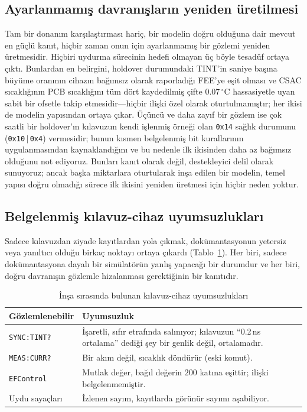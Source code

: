 \documentclass[9pt,twocolumn,a4paper]{extarticle}
\begin{document}
\subsection{Ayarlanmamış davranışların yeniden üretilmesi}
Tam bir donanım karşılaştırması hariç, bir modelin doğru olduğuna dair mevcut en güçlü kanıt, hiçbir zaman onun için ayarlanmamış bir gözlemi yeniden üretmesidir. Hiçbiri uydurma sürecinin hedefi olmayan üç böyle tesadüf ortaya çıktı. Bunlardan en belirgini, holdover durumundaki TINT'in saniye başına büyüme oranının cihazın bağımsız olarak raporladığı FEE'ye eşit olması ve CSAC sıcaklığının PCB sıcaklığını tüm dört kaydedilmiş çifte $0.07\,^\circ$C hassasiyetle uyan sabit bir ofsetle takip etmesidir---hiçbir ilişki özel olarak oturtulmamıştır; her ikisi de modelin yapısından ortaya çıkar. Üçüncü ve daha zayıf bir gözlem ise çok saatli bir holdover'ın kılavuzun kendi işlenmiş örneği olan \texttt{0x14} sağlık durumunu (\texttt{0x10}\,$\vert$\,\texttt{0x4}) vermesidir; bunun kısmen belgelenmiş bit kurallarının uygulanmasından kaynaklandığını ve bu nedenle ilk ikisinden daha az bağımsız olduğunu not ediyoruz. Bunları kanıt olarak değil, destekleyici delil olarak sunuyoruz; ancak başka miktarlara oturtularak inşa edilen bir modelin, temel yapısı doğru olmadığı sürece ilk ikisini yeniden üretmesi için hiçbir neden yoktur.

\subsection{Belgelenmiş kılavuz-cihaz uyumsuzlukları}
Sadece kılavuzdan ziyade kayıtlardan yola çıkmak, dokümantasyonun yetersiz veya yanıltıcı olduğu birkaç noktayı ortaya çıkardı (Tablo~\ref{tab:discrepancies}). Her biri, sadece dokümantasyona dayalı bir simülatörün yanlış yapacağı bir durumdur ve her biri, doğru davranışın gözlemle hizalanması gerektiğinin bir kanıtıdır.

\begin{table}[t]
\caption{İnşa sırasında bulunan kılavuz-cihaz uyumsuzlukları}
\label{tab:discrepancies}
\centering
\renewcommand{\arraystretch}{1.25}
\begin{tabular}{@{}p{}p{}@{}}
\toprule
\textbf{Gözlemlenebilir} & \textbf{Uyumsuzluk} \\
\midrule
\texttt{SYNC:TINT?} & İşaretli, sıfır etrafında salınıyor; kılavuzun ``0.2\,ns ortalama'' dediği şey bir genlik değil, ortalamadır. \\
\texttt{MEAS:CURR?} & Bir akım değil, sıcaklık döndürür (eski komut). \\
\texttt{EFControl} & Mutlak değer, bağıl değerin $200$ katına eşittir; ilişki belgelenmemiştir. \\
Uydu sayaçları & İzlenen sayım, kayıtlarda görünür sayımı aşabiliyor. \\
\bottomrule
\end{tabular}
\end{table}
\end{document}
